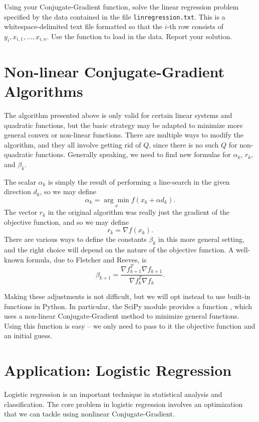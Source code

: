 \begin{problem}
Using your Conjugate-Gradient function, solve the linear regression problem specified by the data contained in the file
\texttt{linregression.txt}. This is a whitespace-delimited text file formatted so that the $i$-th row consists of
$y_i, x_{i,1}, \ldots, x_{i,n}$. Use the function  to load in the data. Report your solution.
\end{problem}

\section*{Non-linear Conjugate-Gradient Algorithms}
The algorithm presented above is only valid for certain linear systems and quadratic functions, but the basic strategy may be adapted
to minimize more general convex or non-linear functions. There are multiple ways to modify the algorithm, and they all involve getting
rid of $Q$, since there is no such $Q$ for non-quadratic functions. Generally speaking, we need to find new formulas for $\alpha_k$,
$r_k$, and $\beta_k$.

The scalar $\alpha_k$ is simply the result of performing a line-search in the given direction $d_k$, so we may define
\[
\alpha_k = \underset{x}{\arg\min}f(x_k + \alpha d_k).
\]
The vector $r_k$ in the original algorithm was really just the gradient of the objective
function, and so we may define
\[
r_k = \nabla f(x_k).
\]
There are various ways to define the constants $\beta_k$ in this more general setting, and the
right choice will depend on the nature of the objective function. A well-known formula, due to Fletcher and Reeves, is
\[
\beta_{k+1} = \frac{\nabla f_{k+1}^T \nabla f_{k+1}}{\nabla f_{k}^T \nabla f_{k}}.
\]

Making these adjustments is not difficult, but we will opt instead to use built-in functions in Python. In particular,
the SciPy module  provides a function , which uses a non-linear Conjugate-Gradient method
to minimize general functions. Using this function is easy -- we only need to pass to it the objective function and an
initial guess.

\section*{Application: Logistic Regression}
Logistic regression is an important technique in statistical analysis and classification. The core problem in
logistic regression involves an optimization that we can tackle using nonlinear Conjugate-Gradient.

